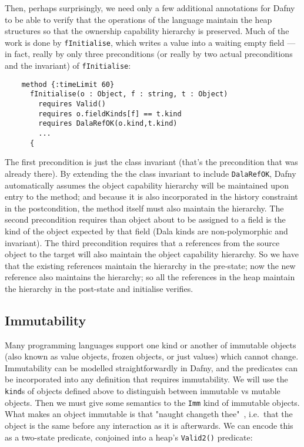 Then, perhaps surprisingly, we need only a few additional annotations for Dafny to be able to verify that the operations of the language maintain the heap structures so that the ownership capability hierarchy is preserved. Much of the work is done by \lstinline+fInitialise+, which writes a  value into a waiting empty field --- 
in fact, really by only three preconditions (or really by two actual preconditions and the invariant) of \lstinline+fInitialise+:

\begin{lstlisting}
    method {:timeLimit 60}
      fInitialise(o : Object, f : string, t : Object) 
        requires Valid()
        requires o.fieldKinds[f] == t.kind
        requires DalaRefOK(o.kind,t.kind)
        ...
      {
\end{lstlisting}

The first precondition is just the class invariant (that's the precondition that was already there).  By extending the the class invariant to include \lstinline+DalaRefOK+, Dafny automatically assumes the object capability hierarchy will be maintained upon entry to the method; and because it is also incorporated in the history constraint in the postcondition, the method itself must also maintain the hierarchy.  The second precondition requires than  object about to be assigned to a field is the kind of the object expected by that field (Dala kinds are non-polymorphic and invariant). The third precondition requires that a references from the source object to the target will also maintain the object capability hierarchy.   So we have that the existing references maintain the  hierarchy in the pre-state; now the new reference also maintains the hierarchy; so all the references in the heap maintain the hierarchy in the post-state and initialise verifies.










\subsection{Immutability}

Many programming languages support one kind or another of immutable objects (also known as value objects, frozen objects, or just values) which cannot change.  Immutability can be modelled straightforwardly in Dafny, and the predicates can be incorporated into any definition that requires immutability.
We will use the \lstinline+kind+s of objects defined above to distinguish between immutable vs mutable objects.
Then we must give some semantics to the \lstinline+Imm+ kind of immutable objects. What makes an object immutable is that "naught changeth thee"~\cite{immortalinvisible}, i.e.\ that the object is the same before any interaction as it is afterwards.  We can encode this as a two-state predicate, conjoined into a heap's \lstinline+Valid2()+ predicate:

